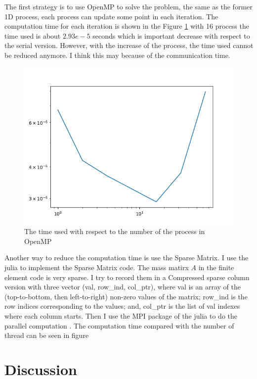 \documentclass[11pt]{article}
\begin{document}
The first strategy  is to use OpenMP to solve the problem, the same as the former 1D process, each process can update some point in each iteration. The computation time for each iteration is shown in the Figure \ref{fig:2D openMP time} with  16 process the time used is about $2.93e-5$ seconds which is important decrease with respect to the serial version. However, with the increase of the process, the time used cannot be reduced anymore. I think this may because of the communication time.
\begin{figure}
    \centering
    \includegraphics[width=0.8\linewidth]{CPP_code/2D_problem/cpp_code/openmp/sphere/time_OpenMP_2D.png}
    \caption{The time used with respect to the number of the process in OpenMP}
    \label{fig:2D openMP time}
\end{figure}

Another way to reduce the computation time is use the Sparse Matrix. I use the julia to implement the Sparse Matrix code. The mass matirx $A$ in the finite element code is very sparse. I try to record them in a Compressed sparse column version with three vector (val, row\_ind, col\_ptr), where val is an array of the (top-to-bottom, then left-to-right) non-zero values of the matrix; row\_ind is the row indices corresponding to the values; and, col\_ptr is the list of val indexes where each column starts. Then I use the MPI package of the julia to do the parallel computation \cite{Byrne2021}. The computation time compared with the number of thread can be seen in figure

\section{Discussion}
\printbibliography %
\end{document}
